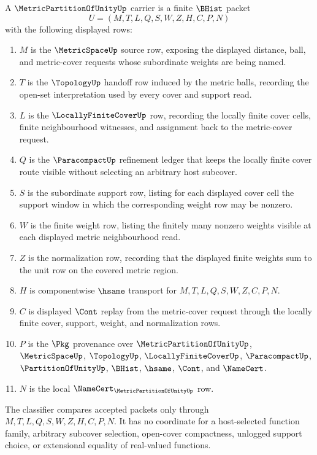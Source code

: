 \begin{definition}
\label{def:metric-partition-of-unity-carrier}
A $\MetricPartitionOfUnityUp$ carrier is a finite $\BHist$ packet
$$
U=(M,T,L,Q,S,W,Z,H,C,P,N)
$$
with the following displayed rows:
\begin{enumerate}
\item $M$ is the $\MetricSpaceUp$ source row, exposing the displayed distance, ball, and metric-cover requests whose subordinate weights are being named.
\item $T$ is the $\TopologyUp$ handoff row induced by the metric balls, recording the open-set interpretation used by every cover and support read.
\item $L$ is the $\LocallyFiniteCoverUp$ row, recording the locally finite cover cells, finite neighbourhood witnesses, and assignment back to the metric-cover request.
\item $Q$ is the $\ParacompactUp$ refinement ledger that keeps the locally finite cover route visible without selecting an arbitrary host subcover.
\item $S$ is the subordinate support row, listing for each displayed cover cell the support window in which the corresponding weight row may be nonzero.
\item $W$ is the finite weight row, listing the finitely many nonzero weights visible at each displayed metric neighbourhood read.
\item $Z$ is the normalization row, recording that the displayed finite weights sum to the unit row on the covered metric region.
\item $H$ is componentwise $\hsame$ transport for $M,T,L,Q,S,W,Z,C,P,N$.
\item $C$ is displayed $\Cont$ replay from the metric-cover request through the locally finite cover, support, weight, and normalization rows.
\item $P$ is the $\Pkg$ provenance over $\MetricPartitionOfUnityUp$, $\MetricSpaceUp$, $\TopologyUp$, $\LocallyFiniteCoverUp$, $\ParacompactUp$, $\PartitionOfUnityUp$, $\BHist$, $\hsame$, $\Cont$, and $\NameCert$.
\item $N$ is the local $\NameCert_{\MetricPartitionOfUnityUp}$ row.
\end{enumerate}
The classifier compares accepted packets only through $M,T,L,Q,S,W,Z,H,C,P,N$. It has no coordinate for a host-selected function family, arbitrary subcover selection, open-cover compactness, unlogged support choice, or extensional equality of real-valued functions.
\end{definition}

